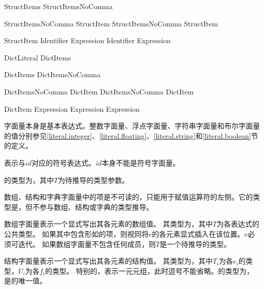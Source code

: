 \begin{bnf}{StructItems}
    StructItemsNoComma \terminal{,}\bnfq
\end{bnf}

\begin{bnf}{StructItemsNoComma}
    StructItem \br
    StructItemsNoComma \terminal{,} StructItem
\end{bnf}

\begin{bnf}{StructItem}
    Identifier \terminal{:} Expression \br
    Identifier \br
     Expression\bnfq
\end{bnf}

\begin{bnf}{DictLiteral}
    \terminal{[} DictItems \terminal{]} \br
    \terminal{[} \terminal{:} \terminal{]}
\end{bnf}

\begin{bnf}{DictItems}
    DictItemsNoComma \terminal{,}\bnfq
\end{bnf}

\begin{bnf}{DictItemsNoComma}
    DictItem \br
    DictItemsNoComma \terminal{,} DictItem
\end{bnf}

\begin{bnf}{DictItem}
    Expression \terminal{:} Expression \br
     Expression
\end{bnf}

\pnum
字面量本身是基本表达式。整数字面量、浮点字面量、字符串字面量和布尔字面量的值分别参见\ref{literal.integer}、\ref{literal.floating}、\ref{literal.string}和\ref{literal.boolean}节的定义。

\pnum
{}表示与$id$对应的符号表达式。$id$本身不能是符号字面量。

\pnum
{}的类型为，其中$T$为待推导的类型参数。

\pnum
数组、结构和字典字面量中的项是不可读的，只能用于赋值运算符的左侧。它的类型是，但不参与数组、结构或字典的类型推导。

\pnum
数组字面量\tcode{[$e_1$, $\ldots$, $e_n$]}表示一个显式写出其各元素的数组值。
其类型为，其中$T$为各表达式的公共类型。
如果其中包含形如的项，则视同将$e$的各元素显式插入在该位置。$e$必须可迭代。
如果数组字面量不包含任何成员，则$T$是一个待推导的类型。

\pnum
结构字面量表示一个显式写出其各元素的结构值。
其类型为，其中$T_i$为各$e_i$的类型，$U_i$为各$f_i$的类型。
特别的，表示一元元组，此时逗号不能省略。\tcode{()}的类型为，是的唯一值。

